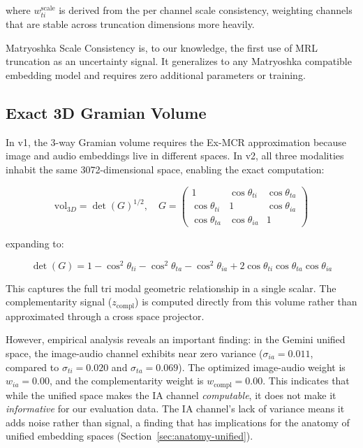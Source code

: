 \documentclass[a4paper,fleqn]{cas-sc}
\begin{document}
\begin{itemize}
where $w_{ti}^{\mathrm{scale}}$ is derived from the per channel scale consistency, weighting channels that are stable across truncation dimensions more heavily.

Matryoshka Scale Consistency is, to our knowledge, the first use of MRL truncation as an uncertainty signal. It generalizes to any Matryoshka compatible embedding model and requires zero additional parameters or training.

\subsection{Exact 3D Gramian Volume}\label{sec:v2-exact-3d}

In v1, the 3-way Gramian volume requires the Ex-MCR approximation because image and audio embeddings live in different spaces. In v2, all three modalities inhabit the same 3072-dimensional space, enabling the exact computation:

\begin{equation}\label{eq:v2-3d-gram}
\mathrm{vol}_{3D} = \det(G)^{1/2}, \quad G = \begin{pmatrix} 1 & \cos\theta_{ti} & \cos\theta_{ta} \\ \cos\theta_{ti} & 1 & \cos\theta_{ia} \\ \cos\theta_{ta} & \cos\theta_{ia} & 1 \end{pmatrix}
\end{equation}

expanding to:

\begin{equation}\label{eq:v2-3d-det}
\det(G) = 1 - \cos^2\theta_{ti} - \cos^2\theta_{ta} - \cos^2\theta_{ia} + 2\cos\theta_{ti}\cos\theta_{ta}\cos\theta_{ia}
\end{equation}

This captures the full tri modal geometric relationship in a single scalar. The complementarity signal ($z_{\mathrm{compl}}$) is computed directly from this volume rather than approximated through a cross space projector.

However, empirical analysis reveals an important finding: in the Gemini unified space, the image-audio channel exhibits near zero variance ($\sigma_{ia} = 0.011$, compared to $\sigma_{ti} = 0.020$ and $\sigma_{ta} = 0.069$). The optimized image-audio weight is $w_{ia} = 0.00$, and the complementarity weight is $w_{\mathrm{compl}} = 0.00$. This indicates that while the unified space makes the IA channel \emph{computable}, it does not make it \emph{informative} for our evaluation data. The IA channel's lack of variance means it adds noise rather than signal, a finding that has implications for the anatomy of unified embedding spaces (Section~\ref{sec:anatomy-unified}).


\end{itemize}
\end{document}
